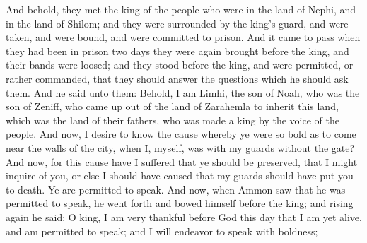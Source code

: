 And behold, they met the king of the people who were in the land of Nephi, and in the land of Shilom; and they were surrounded by the king's guard, and were taken, and were bound, and were committed to prison.
\bverse \iffalse And it came to pass when they had been in prison two days they were again brought before the king, and their bands were loosed; and they stood before the king, and were permitted, or rather commanded, that they should answer the questions which he should ask them. \fi
And it came to pass when they had been in prison two days they were again brought before the king, and their bands were loosed; and they stood before the king, and were permitted, or rather commanded, that they should answer the questions which he should ask them.
\bverse \iffalse And he said unto them: Behold, I am Limhi, the son of Noah, who was the son of Zeniff, who came up out of the land of Zarahemla to inherit this land, which was the land of their fathers, who was made a king by the voice of the people. \fi
And he said unto them: Behold, I am Limhi, the son of Noah, who was the son of Zeniff, who came up out of the land of Zarahemla to inherit this land, which was the land of their fathers, who was made a king by the voice of the people.
\bverse \iffalse And now, I desire to know the cause whereby ye were so bold as to come near the walls of the city, when I, myself, was with my guards without the gate? \fi
And now, I desire to know the cause whereby ye were so bold as to come near the walls of the city, when I, myself, was with my guards without the gate?
\bverse \iffalse And now, for this cause have I suffered that ye should be preserved, that I might inquire of you, or else I should have caused that my guards should have put you to death. Ye are permitted to speak. \fi
And now, for this cause have I suffered that ye should be preserved, that I might inquire of you, or else I should have caused that my guards should have put you to death. Ye are permitted to speak.
\bverse \iffalse And now, when Ammon saw that he was permitted to speak, he went forth and bowed himself before the king; and rising again he said: O king, I am very thankful before God this day that I am yet alive, and am permitted to speak; and I will endeavor to speak with boldness; \fi
And now, when Ammon saw that he was permitted to speak, he went forth and bowed himself before the king; and rising again he said: O king, I am very thankful before God this day that I am yet alive, and am permitted to speak; and I will endeavor to speak with boldness;
